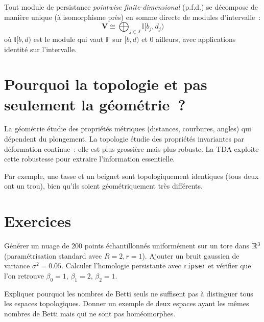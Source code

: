 \begin{theoreme}
Tout module de persistance \emph{pointwise finite-dimensional} (p.f.d.)
se d\'ecompose de mani\`ere unique (\`a isomorphisme pr\`es) en somme
directe de modules d'intervalle~:
\[
  \mathbf{V} \cong \bigoplus_{j \in J} \mathbb{I}[b_j, d_j)
\]
o\`u $\mathbb{I}[b,d)$ est le module qui vaut $\mathbb{F}$ sur $[b,d)$
et $0$ ailleurs, avec applications identit\'e sur l'intervalle.
\end{theoreme}

\section{Pourquoi la topologie et pas seulement la g\'eom\'etrie~?}

\begin{remarque}
La g\'eom\'etrie \'etudie des propri\'et\'es m\'etriques (distances,
courbures, angles) qui d\'ependent du plongement. La topologie \'etudie
des propri\'et\'es invariantes par d\'eformation continue~: elle est plus
grossi\`ere mais plus robuste. La TDA exploite cette robustesse pour
extraire l'information essentielle.

Par exemple, une tasse et un beignet sont topologiquement identiques
(tous deux ont un trou), bien qu'ils soient g\'eom\'etriquement tr\`es
diff\'erents.
\end{remarque}

\section{Exercices}

\begin{exercice}
G\'en\'erer un nuage de $200$ points \'echantillonn\'es uniform\'ement
sur un tore dans $\mathbb{R}^3$ (param\'etrisation standard avec $R=2, r=1$).
Ajouter un bruit gaussien de variance $\sigma^2 = 0.05$. Calculer
l'homologie persistante avec \texttt{ripser} et v\'erifier que l'on
retrouve $\beta_0 = 1$, $\beta_1 = 2$, $\beta_2 = 1$.
\end{exercice}

\begin{exercice}
Expliquer pourquoi les nombres de Betti seuls ne suffisent pas \`a
distinguer tous les espaces topologiques. Donner un exemple de deux
espaces ayant les m\^emes nombres de Betti mais qui ne sont pas
hom\'eomorphes.
\end{exercice}


